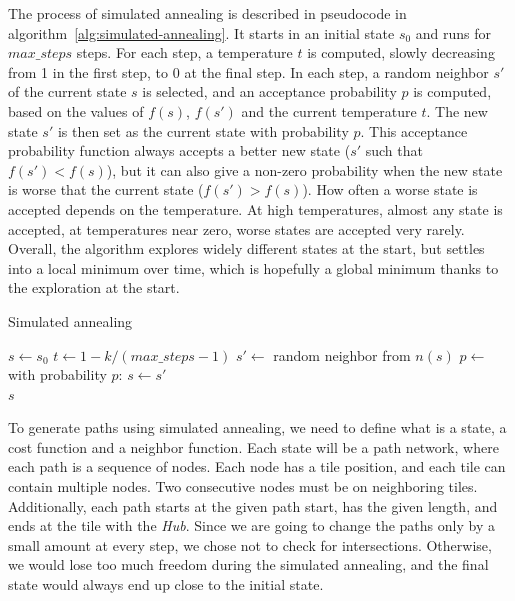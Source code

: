 The process of simulated annealing is described in pseudocode in algorithm~\ref{alg:simulated-annealing}.
It starts in an initial state $s_0$ and runs for $max\_steps$ steps.
For each step, a temperature $t$ is computed, slowly decreasing from 1 in the first step, to 0 at the final step.
In each step, a random neighbor $s'$ of the current state $s$ is selected, and an acceptance probability $p$ is computed, based on the values of $f(s)$, $f(s')$ and the current temperature $t$.
The new state $s'$ is then set as the current state with probability $p$.
This acceptance probability function always accepts a better new state ($s'$ such that $f(s') < f(s)$), but it can also give a non-zero probability when the new state is worse that the current state ($f(s') > f(s)$).
How often a worse state is accepted depends on the temperature.
At high temperatures, almost any state is accepted, at temperatures near zero, worse states are accepted very rarely.
Overall, the algorithm explores widely different states at the start, but settles into a local minimum over time, which is hopefully a global minimum thanks to the exploration at the start.

\begin{algorithm}[H]
    \caption{Simulated annealing}
    \label{alg:simulated-annealing}
    \begin{algorithmic}[0]
        \State $s \gets s_0$
        \State $t \gets 1 - k/(max\_steps-1)$
        \State $s' \gets$ random neighbor from $n(s)$
        \State $p \gets$ 
        \State with probability $p$: $s \gets s'$
        \EndFor\\
        \Return $s$
        \Statex
    \end{algorithmic}
\end{algorithm}

To generate paths using simulated annealing, we need to define what is a state, a cost function and a neighbor function.
Each state will be a path network, where each path is a sequence of nodes.
Each node has a tile position, and each tile can contain multiple nodes.
Two consecutive nodes must be on neighboring tiles.
Additionally, each path starts at the given path start, has the given length, and ends at the tile with the \emph{Hub}.
Since we are going to change the paths only by a small amount at every step, we chose not to check for intersections.
Otherwise, we would lose too much freedom during the simulated annealing, and the final state would always end up close to the initial state.


